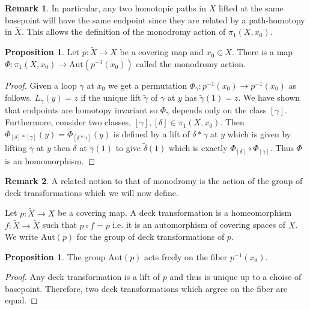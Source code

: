 \documentclass[12pt]{extarticle}
\theoremstyle{definition}
\newtheorem{proposition}[theorem]{Proposition}
\newtheorem{remark}{Remark}
\newenvironment{definition}[1][Definition:]{\begin{trivlist}
\item[\hskip \labelsep {\bfseries #1}]}{\end{trivlist}}
\newcommand{\Aut}[1]{\mathrm{Aut}\left( #1 \right)}
\begin{document}
\begin{remark}
In particular, any two homotopic paths in $X$ lifted at the same basepoint will have the same endpoint since they are related by a path-homotopy in $\tilde{X}$. This allows the definition of the monodromy action of $\pi_1(X, x_0)$.  
\end{remark}

\begin{proposition}
Let $p : \tilde{X} \to X$ be a covering map and $x_0 \in X$. There is a map $\Phi : \pi_1(X, x_0) \to \Aut{p^{-1}(x_0)}$ called the monodromy action.  
\end{proposition}

\begin{proof}
Given a loop $\gamma$ at $x_0$ we get a permutation $\Phi_\gamma : p^{-1}(x_0) \to p^{-1}(x_0)$ as follows. $L_\gamma(y) = z$ if the unique lift $\tilde{\gamma}$ of $\gamma$ at $y$ has $\tilde{\gamma}(1) = z$. We have shown that endpoints are homotopy invariant so $\Phi_\gamma$ depends only on the class $[\gamma]$. Furthermore, consider two classes, $[\gamma], [\delta] \in \pi_1(X, x_0)$. Then $\Phi_{[\delta] * [\gamma]}(y) = \Phi_{[\delta * \gamma]}(y)$ is defined by a lift of $\delta * \gamma$ at $y$ which is given by lifting $\gamma$ at $y$ then $\delta$ at $\tilde{\gamma}(1)$ to give $\tilde{\delta}(1)$ which is exactly $\Phi_{[\delta]} \circ \Phi_{[\gamma]}$. Thus $\Phi$ is an homomorphism. 
\end{proof}

\begin{remark}
A related notion to that of monodromy is the action of the group of deck transformations which we will now define.
\end{remark}

\begin{definition}
Let $p : \tilde{X} \to X$ be a covering map. A deck transformation is a homeomorphism $f : \tilde{X} \to \tilde{X}$ such that $p \circ f = p$ i.e. it is an automorphism of covering spaces of $X$. We write $\Aut{p}$ for the group of deck transformations of $p$. 
\end{definition}

\begin{proposition}
The group $\Aut{p}$ acts freely on the fiber $p^{-1}(x_0)$.
\end{proposition}

\begin{proof}
Any deck transformation is a lift of $p$ and thus is unique up to a choise of basepoint. Therefore, two deck transformations which argree on the fiber are equal.
\end{proof}
\end{document}
